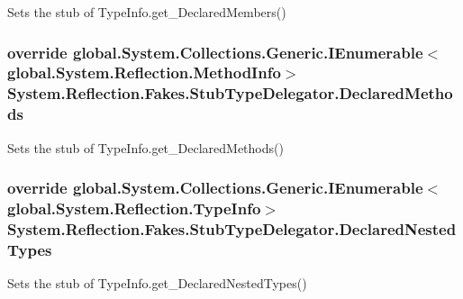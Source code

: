Sets the stub of Type\-Info.\-get\-\_\-\-Declared\-Members()

\hypertarget{class_system_1_1_reflection_1_1_fakes_1_1_stub_type_delegator_a7e7c8e0f2ae7aff901ac56edc923b245}{
\subsubsection[{Declared\-Methods}]{\setlength{\rightskip}{0pt plus 5cm}override global.\-System.\-Collections.\-Generic.\-I\-Enumerable$<$global.\-System.\-Reflection.\-Method\-Info$>$ System.\-Reflection.\-Fakes.\-Stub\-Type\-Delegator.\-Declared\-Methods\hspace{0.3cm}{\ttfamily [get]}}}\label{class_system_1_1_reflection_1_1_fakes_1_1_stub_type_delegator_a7e7c8e0f2ae7aff901ac56edc923b245}


Sets the stub of Type\-Info.\-get\-\_\-\-Declared\-Methods()

\hypertarget{class_system_1_1_reflection_1_1_fakes_1_1_stub_type_delegator_a2a4f6f7a7f24a2bba7d92a208e0315db}{
\subsubsection[{Declared\-Nested\-Types}]{\setlength{\rightskip}{0pt plus 5cm}override global.\-System.\-Collections.\-Generic.\-I\-Enumerable$<$global.\-System.\-Reflection.\-Type\-Info$>$ System.\-Reflection.\-Fakes.\-Stub\-Type\-Delegator.\-Declared\-Nested\-Types\hspace{0.3cm}{\ttfamily [get]}}}\label{class_system_1_1_reflection_1_1_fakes_1_1_stub_type_delegator_a2a4f6f7a7f24a2bba7d92a208e0315db}


Sets the stub of Type\-Info.\-get\-\_\-\-Declared\-Nested\-Types()

